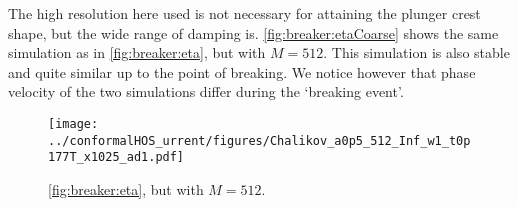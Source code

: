 \documentclass[a4paper,12pt]{article}
\renewcommand{\_}[1]{_\mr{#1}}
\begin{document}
The high resolution here used is not necessary for attaining the plunger crest shape, but the wide range of damping is.
\autoref{fig:breaker:etaCoarse} shows the same simulation as in \autoref{fig:breaker:eta}, but with $M=512$.
This simulation is also stable and quite similar up to the point of breaking. We notice however that phase velocity of the two simulations differ during the `breaking event'.
\begin{figure}[h!ptb]%
\centering
\texttt{[image: ../conformalHOS\_current/figures/Chalikov\_ka0p5\_M512\_hInf\_Nw1\_dt0p177T\_nx1025\_pad1.pdf]}%
\caption{\autoref{fig:breaker:eta}, but with $M=512$.}%
\label{fig:breaker:etaCoarse}%
\end{figure}




\end{document}
